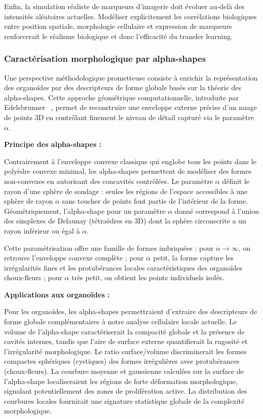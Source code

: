 Enfin, la simulation réaliste de marqueurs d'imagerie doit évoluer au-delà des intensités aléatoires actuelles. Modéliser explicitement les corrélations biologiques entre position spatiale, morphologie cellulaire et expression de marqueurs renforcerait le réalisme biologique et donc l'efficacité du transfer learning.

\subsubsection{Caractérisation morphologique par alpha-shapes}

Une perspective méthodologique prometteuse consiste à enrichir la représentation des organoïdes par des descripteurs de forme globale basés sur la théorie des alpha-shapes. Cette approche géométrique computationnelle, introduite par Edelsbrunner ~\cite{Edelsbrunner1983,Edelsbrunner1994}, permet de reconstruire une enveloppe externe précise d'un nuage de points 3D en contrôlant finement le niveau de détail capturé via le paramètre $\alpha$.

\textbf{Principe des alpha-shapes :}

Contrairement à l'enveloppe convexe classique qui englobe tous les points dans le polyèdre convexe minimal, les alpha-shapes permettent de modéliser des formes non-convexes en autorisant des concavités contrôlées. Le paramètre $\alpha$ définit le rayon d'une sphère de sondage : seules les régions de l'espace accessibles à une sphère de rayon $\alpha$ sans toucher de points font partie de l'intérieur de la forme. Géométriquement, l'alpha-shape pour un paramètre $\alpha$ donné correspond à l'union des simplexes de Delaunay (tétraèdres en 3D) dont la sphère circonscrite a un rayon inférieur ou égal à $\alpha$.

Cette paramétrisation offre une famille de formes imbriquées : pour $\alpha \to \infty$, on retrouve l'enveloppe convexe complète ; pour $\alpha$ petit, la forme capture les irrégularités fines et les protubérances locales caractéristiques des organoïdes choux-fleurs ; pour $\alpha$ très petit, on obtient les points individuels isolés.

\textbf{Applications aux organoïdes :}

Pour les organoïdes, les alpha-shapes permettraient d'extraire des descripteurs de forme globale complémentaires à notre analyse cellulaire locale actuelle. Le volume de l'alpha-shape caractériserait la compacité globale et la présence de cavités internes, tandis que l'aire de surface externe quantifierait la rugosité et l'irrégularité morphologique. Le ratio surface/volume discriminerait les formes compactes sphériques (cystiques) des formes irrégulières avec protubérances (choux-fleurs). La courbure moyenne et gaussienne calculées sur la surface de l'alpha-shape localiseraient les régions de forte déformation morphologique, signalant potentiellement des zones de prolifération active. La distribution des courbures locales fournirait une signature statistique globale de la complexité morphologique.

